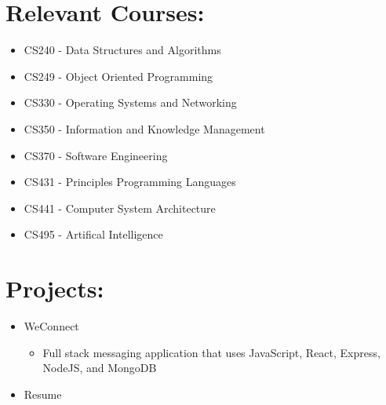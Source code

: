 \documentclass[12pt, oneside, a4paper]{article}
\begin{document}
    \section*{Relevant Courses:}
    \begin{itemize}
    \scriptsize
        \item CS240 - Data Structures and Algorithms
        \item CS249 - Object Oriented Programming
        \item CS330 - Operating Systems and Networking
        \item CS350 - Information and Knowledge Management
        \item CS370 - Software Engineering
        \item CS431 - Principles Programming Languages
        \item CS441 - Computer System Architecture
        \item CS495 - Artifical Intelligence
    \end{itemize}

    \section*{Projects:}
    \begin{itemize}
    \scriptsize
        \item WeConnect
            \begin{itemize}
                \item Full stack messaging application that uses JavaScript, React, Express, NodeJS, and MongoDB
            \end{itemize}
        \item Resume 
    \end{itemize} 
\end{document}
